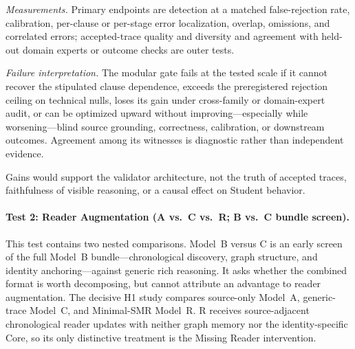 \documentclass[11pt]{article}
\begin{document}
\emph{Measurements.} Primary endpoints are detection
at a matched false-rejection rate, calibration, per-clause or per-stage error
localization, overlap, omissions, and correlated errors;
accepted-trace quality and diversity and agreement with held-out domain experts
or outcome checks are outer tests.

\emph{Failure interpretation.} The modular gate fails at the tested scale if it cannot recover the stipulated
clause dependence, exceeds the preregistered rejection ceiling on technical
nulls, loses its gain under cross-family or domain-expert audit, or can be
optimized upward without improving---especially while worsening---blind source
grounding, correctness, calibration, or downstream outcomes. Agreement among
its witnesses is diagnostic rather than independent evidence.

Gains would support the validator architecture, not the truth of accepted
traces, faithfulness of visible reasoning, or a causal effect on Student behavior.

\paragraph{Test 2: Reader Augmentation (A vs.\ C vs.\ R; B vs.\ C bundle screen).}
This test contains two nested comparisons. Model~B versus C is an early screen
of the full Model~B bundle---chronological discovery, graph structure, and identity
anchoring---against generic rich reasoning. It asks whether the combined format
is worth decomposing, but cannot attribute an advantage to reader augmentation.
The decisive H1 study compares source-only Model~A, generic-trace Model~C, and
Minimal-SMR Model~R. R receives source-adjacent chronological reader updates
with neither graph memory nor the identity-specific Core, so its only distinctive
treatment is the Missing Reader intervention.
\end{document}

